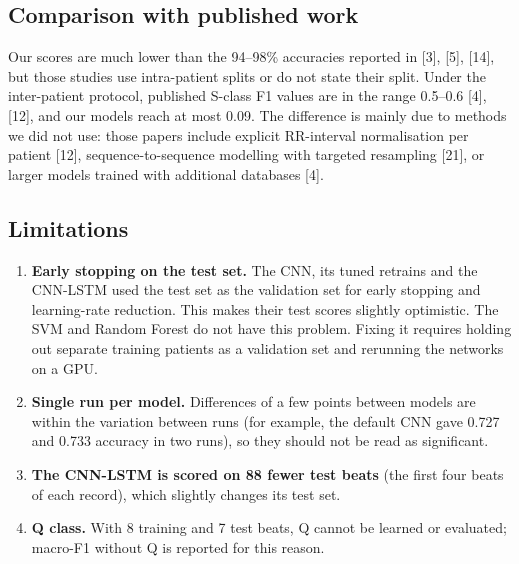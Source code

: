 \documentclass[11pt,a4paper]{article}
\begin{document}
\subsection{Comparison with published work}
Our scores are much lower than the 94--98\% accuracies reported in [3], [5], [14], but those studies use intra-patient splits or do not state their split. Under the inter-patient protocol, published S-class F1 values are in the range 0.5--0.6 [4], [12], and our models reach at most 0.09. The difference is mainly due to methods we did not use: those papers include explicit RR-interval normalisation per patient [12], sequence-to-sequence modelling with targeted resampling [21], or larger models trained with additional databases [4].

\subsection{Limitations}
\begin{enumerate}
\item \textbf{Early stopping on the test set.} The CNN, its tuned retrains and the CNN-LSTM used the test set as the validation set for early stopping and learning-rate reduction. This makes their test scores slightly optimistic. The SVM and Random Forest do not have this problem. Fixing it requires holding out separate training patients as a validation set and rerunning the networks on a GPU.
\item \textbf{Single run per model.} Differences of a few points between models are within the variation between runs (for example, the default CNN gave 0.727 and 0.733 accuracy in two runs), so they should not be read as significant.
\item \textbf{The CNN-LSTM is scored on 88 fewer test beats} (the first four beats of each record), which slightly changes its test set.
\item \textbf{Q class.} With 8 training and 7 test beats, Q cannot be learned or evaluated; macro-F1 without Q is reported for this reason.
\end{enumerate}

\end{document}
